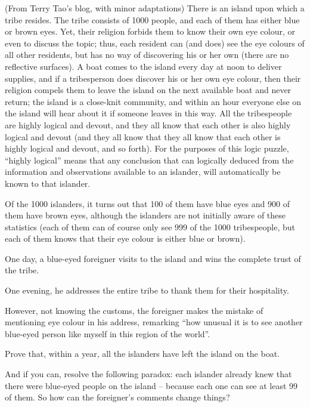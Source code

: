 \documentclass[10pt]{article}
\begin{document}
\medskip{} (From Terry Tao's blog, with minor adaptations) There is an island upon which a tribe resides. The tribe consists of 1000 people, and each of them has either blue or brown eyes. Yet, their religion forbids them to know their own eye colour, or even to discuss the topic; thus, each resident can (and does) see the eye colours of all other residents, but has no way of discovering his or her own (there are no reflective surfaces). A boat comes to the island every day at noon to deliver supplies, and if a tribesperson does discover his or her own eye colour, then their religion compels them to leave the island on the next available boat and never return; the island is a close-knit community, and within an hour everyone else on the island will hear about it if someone leaves in this way. All the tribespeople are highly logical and devout, and they all know that each other is also highly logical and devout (and they all know that they all know that each other is highly logical and devout, and so forth). For the purposes of this logic puzzle, ``highly logical'' means that any conclusion that can logically deduced from the information and observations available to an islander, will automatically be known to that islander.

Of the 1000 islanders, it turns out that 100 of them have blue eyes and 900 of them have brown eyes, although the islanders are not initially aware of these statistics (each of them can of course only see 999 of the 1000 tribespeople, but each of them knows that their eye colour is either blue or brown).

One day, a blue-eyed foreigner visits to the island and wins the complete trust of the tribe.

One evening, he addresses the entire tribe to thank them for their hospitality.

However, not knowing the customs, the foreigner makes the mistake of mentioning eye colour in his address, remarking ``how unusual it is to see another blue-eyed person like myself in this region of the world''.

\medskip

Prove that, within a year, all the islanders have left the island on the boat.

\medskip

And if you can, resolve the following paradox: each islander already knew that there were blue-eyed people on the island -- because each one can see at least 99 of them. So how can the foreigner's comments change things?
\end{document}
